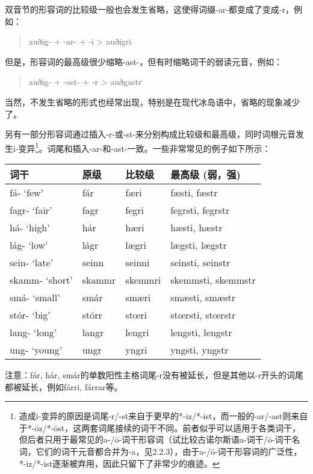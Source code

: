 双音节的形容词的比较级一般也会发生省略，这使得词缀-ar-都变成了变成-r，例如：

\begin{quote}
  auðig- + -ar- + -i \textgreater{} auðigri
\end{quote}

但是，形容词的最高级很少缩略-ast-，但有时缩略词干的弱读元音，例如：

\begin{quote}
  auðig- + -ast- + -r \textgreater{} auðgastr
\end{quote}

当然，不发生省略的形式也经常出现，特别是在现代冰岛语中，省略的现象减少了。

另有一部分形容词通过插入-r-或-st-来分别构成比较级和最高级，同时词根元音发生i-变异\footnote{造成i-变异的原因是词尾-r/-st来自于更早的*-iz/*-ist，而一般的-ar/-ast则来自于*-ōz/*-ōst，这两套词尾接续的词干不同。前者似乎可以适用于各类词干，但后者只用于最常见的a-/ō-词干形容词（试比较古诺尔斯语a-词干/ō-词干名词，它们的词干元音都合并为-a，见2.2.3），由于a-/ō-词干形容词的广泛性，*-iz/*-ist逐渐被弃用，因此只留下了非常少的痕迹。}。词尾和插入-ar-和-ast-一致。一些非常常见的例子如下所示：

\begin{longtable}{llll}
  \toprule
  词干           & 原级   & 比较级  & 最高级 (弱，强)     \\
  \midrule
  \endhead
  \bottomrule
  \endfoot
  fá- `few‌'      & fár    & færi    & fæsti, fæstr       \\
  fagr- `fair‌'   & fagr   & fegri   & fegrsti, fegrstr   \\
  há- `high‌'     & hár    & hæri    & hæsti, hæstr       \\
  lág- `low‌'     & lágr   & lægri   & lægsti, lægstr     \\
  sein- `late‌'   & seinn  & seinni  & seinsti, seinstr   \\
  skamm- `short‌' & skammr & skemmri & skemmsti, skemmstr \\
  smá- `small‌'   & smár   & smæri   & smæsti, smæstr     \\
  stór- `big‌'    & stórr  & stœri   & stœrsti, stœrstr   \\
  lang- `long‌'   & langr  & lengri  & lengsti, lengstr   \\
  ung- `young‌'   & ungr   & yngri   & yngsti, yngstr     \\
\end{longtable}

注意：fár, hár,
smár的单数阳性主格词尾-r没有被延长，但是其他以-r开头的词尾都被延长，例如fárri,
fárrar等。

